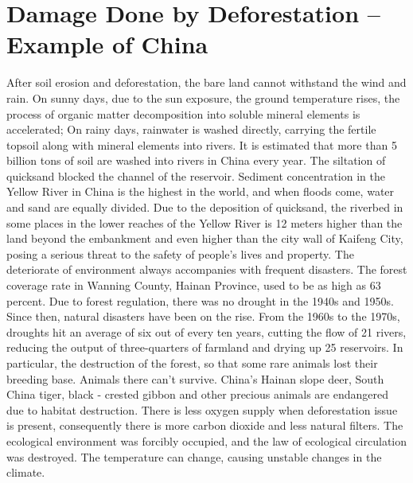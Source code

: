 \documentclass{book}\usepackage{knitr}
\begin{document}
{\section{Damage Done by Deforestation – Example of China}
After soil erosion and deforestation, the bare land cannot withstand the wind and rain. On sunny days, due to the sun exposure, the ground temperature rises, the process of organic matter decomposition into soluble mineral elements is accelerated; On rainy days, rainwater is washed directly, carrying the fertile topsoil along with mineral elements into rivers. It is estimated that more than 5 billion tons of soil are washed into rivers in China every year. The siltation of quicksand blocked the channel of the reservoir. Sediment concentration in the Yellow River in China is the highest in the world, and when floods come, water and sand are equally divided. Due to the deposition of quicksand, the riverbed in some places in the lower reaches of the Yellow River is 12 meters higher than the land beyond the embankment and even higher than the city wall of Kaifeng City, posing a serious threat to the safety of people's lives and property.
The deteriorate of environment always accompanies with frequent disasters. The forest coverage rate in Wanning County, Hainan Province, used to be as high as 63 percent. Due to forest regulation, there was no drought in the 1940s and 1950s. Since then, natural disasters have been on the rise. From the 1960s to the 1970s, droughts hit an average of six out of every ten years, cutting the flow of 21 rivers, reducing the output of three-quarters of farmland and drying up 25 reservoirs. In particular, the destruction of the forest, so that some rare animals lost their breeding base. Animals there can't survive. China's Hainan slope deer, South China tiger, black - crested gibbon and other precious animals are endangered due to habitat destruction. There is less oxygen supply when deforestation issue is present, consequently there is more carbon dioxide and less natural filters. The ecological environment was forcibly occupied, and the law of ecological circulation was destroyed. The temperature can change, causing unstable changes in the climate.

}
\end{document}
